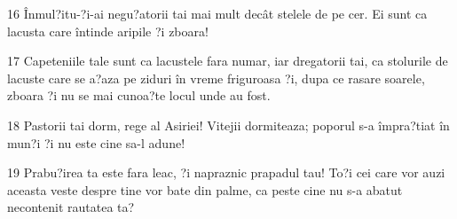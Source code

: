 \par 16 Înmul?itu-?i-ai negu?atorii tai mai mult decât stelele de pe cer. Ei sunt ca lacusta care întinde aripile ?i zboara!
\par 17 Capeteniile tale sunt ca lacustele fara numar, iar dregatorii tai, ca stolurile de lacuste care se a?aza pe ziduri în vreme friguroasa ?i, dupa ce rasare soarele, zboara ?i nu se mai cunoa?te locul unde au fost.
\par 18 Pastorii tai dorm, rege al Asiriei! Vitejii dormiteaza; poporul s-a împra?tiat în mun?i ?i nu este cine sa-l adune!
\par 19 Prabu?irea ta este fara leac, ?i napraznic prapadul tau! To?i cei care vor auzi aceasta veste despre tine vor bate din palme, ca peste cine nu s-a abatut necontenit rautatea ta?


